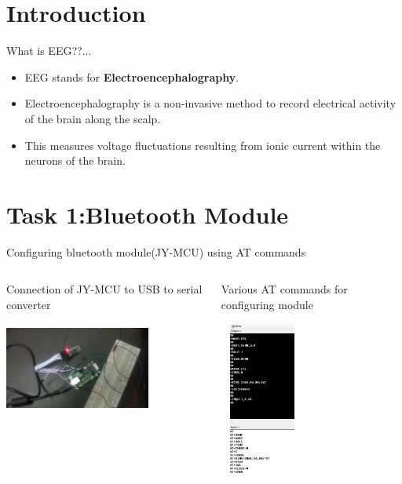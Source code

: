 \documentclass[10pt, a4paper]{beamer}
\begin{document}
\section{Introduction}
\begin{frame}{What is EEG??...}
		\begin{itemize}
			\item EEG stands for \textbf{Electroencephalography}.
			\item Electroencephalography is a non-invasive method to record electrical activity of the brain along the scalp.
			\item This measures voltage fluctuations resulting from ionic current within the neurons of the brain.
		\end{itemize}
	
\end{frame}

\section{Task 1:Bluetooth Module}
\begin{frame}{Configuring bluetooth module(JY-MCU) using AT commands}	
	\begin{columns}[T]
		\begin{column}{.60\textwidth}
			\begin{block}{Connection of JY-MCU to USB to serial converter}
				\graphicspath{ {images/} }
				\includegraphics[width=4.8cm, height=3cm]{BT_Configure}
				\centering
				 \end{block}
				\end{column}
			\begin{column}{.40\textwidth}
				\begin{block}{Various AT commands for configuring module}
					\graphicspath{ {images/} }
					\includegraphics[width=2.8cm, height=5.2cm]{BT-AT_Configure}
					\centering
				\end{block}
			\end{column}
		\end{columns}
\end{frame}
\end{document}
